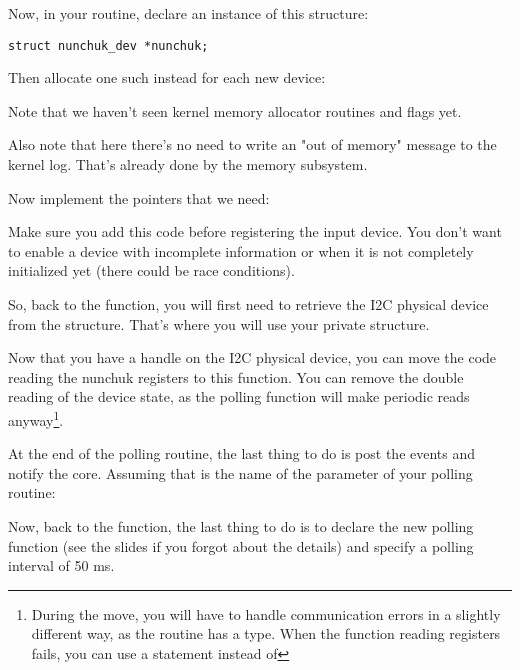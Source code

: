 Now, in your  routine, declare an instance of
this structure:

\begin{verbatim}
struct nunchuk_dev *nunchuk;
\end{verbatim}

Then allocate one such instead for each new device:


Note that we haven't seen kernel memory allocator routines and flags
yet.

Also note that here there's no need to write an "out of memory"
message to the kernel log. That's already done by the memory subsystem.

Now implement the pointers that we need:


Make sure you add this code before registering the input device. You
don't want to enable a device with incomplete information or when it is
not completely initialized yet (there could be race conditions).

So, back to the  function, you will first need to
retrieve the I2C physical device from the 
structure. That's where you will use your private 
structure.

Now that you have a handle on the I2C physical device, you can move the
code reading the nunchuk registers to this function. You can
remove the double reading of the device state, as the polling function
will make periodic reads anyway\footnote{During the move, you will have
to handle communication errors in a slightly different way, as the
 routine has a  type. When the function
reading registers fails, you can use a  statement instead
of }.

At the end of the polling routine, the last thing to do is post the events
and notify the  core. Assuming that  is the
name of the  parameter of your polling routine:


Now, back to the  function, the last thing to do
is to declare the new polling function (see the slides if you forgot
about the details) and specify a polling interval of 50 ms.

